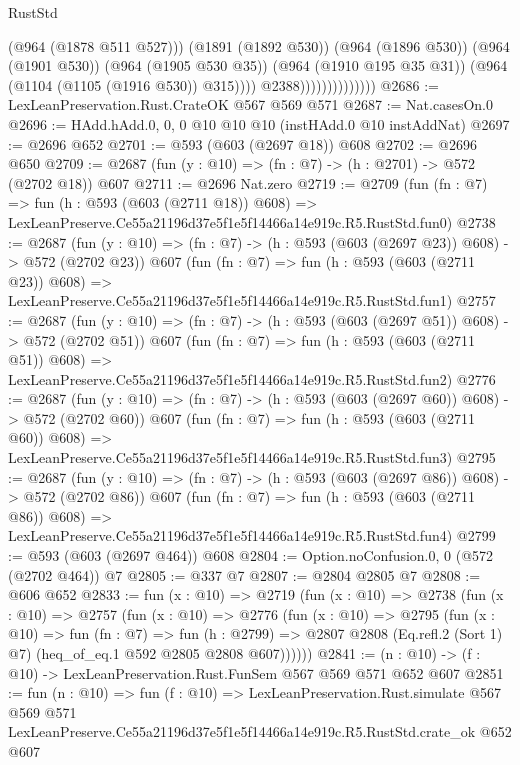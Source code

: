 \begin{lexlean}{RustStd}
\begin{coremodule}
                                      (@964 (@1878 @511 @527)))
                                    (@1891 (@1892 @530))
                                    (@964 (@1896 @530))
                                    (@964 (@1901 @530))
                                    (@964 (@1905 @530 @35))
                                    (@964 (@1910 @195 @35 @31))
                                    (@964 (@1104 (@1105 (@1916 @530)) @315))))
                                @2388))))))))))))))
@2686 := LexLeanPreservation.Rust.CrateOK @567 @569 @571
@2687 := Nat.casesOn.{0}
@2696 := HAdd.hAdd.{0, 0, 0} @10 @10 @10 (instHAdd.{0} @10 instAddNat)
@2697 := @2696 @652
@2701 := @593 (@603 (@2697 @18)) @608
@2702 := @2696 @650
@2709 := @2687 (fun (y : @10) => (fn : @7) -> (h : @2701) -> @572 (@2702 @18)) @607
@2711 := @2696 Nat.zero
@2719 := @2709
    (fun (fn : @7) =>
    fun (h : @593 (@603 (@2711 @18)) @608) =>
    LexLeanPreserve.Ce55a21196d37e5f1e5f14466a14e919c.R5.RustStd.fun0)
@2738 := @2687
    (fun (y : @10) => (fn : @7) -> (h : @593 (@603 (@2697 @23)) @608) -> @572 (@2702 @23))
    @607
    (fun (fn : @7) =>
    fun (h : @593 (@603 (@2711 @23)) @608) =>
    LexLeanPreserve.Ce55a21196d37e5f1e5f14466a14e919c.R5.RustStd.fun1)
@2757 := @2687
    (fun (y : @10) => (fn : @7) -> (h : @593 (@603 (@2697 @51)) @608) -> @572 (@2702 @51))
    @607
    (fun (fn : @7) =>
    fun (h : @593 (@603 (@2711 @51)) @608) =>
    LexLeanPreserve.Ce55a21196d37e5f1e5f14466a14e919c.R5.RustStd.fun2)
@2776 := @2687
    (fun (y : @10) => (fn : @7) -> (h : @593 (@603 (@2697 @60)) @608) -> @572 (@2702 @60))
    @607
    (fun (fn : @7) =>
    fun (h : @593 (@603 (@2711 @60)) @608) =>
    LexLeanPreserve.Ce55a21196d37e5f1e5f14466a14e919c.R5.RustStd.fun3)
@2795 := @2687
    (fun (y : @10) => (fn : @7) -> (h : @593 (@603 (@2697 @86)) @608) -> @572 (@2702 @86))
    @607
    (fun (fn : @7) =>
    fun (h : @593 (@603 (@2711 @86)) @608) =>
    LexLeanPreserve.Ce55a21196d37e5f1e5f14466a14e919c.R5.RustStd.fun4)
@2799 := @593 (@603 (@2697 @464)) @608
@2804 := Option.noConfusion.{0, 0} (@572 (@2702 @464)) @7
@2805 := @337 @7
@2807 := @2804 @2805 @7
@2808 := @606 @652
@2833 := fun (x : @10) =>
  @2719
    (fun (x : @10) =>
    @2738
      (fun (x : @10) =>
      @2757
        (fun (x : @10) =>
        @2776
          (fun (x : @10) =>
          @2795
            (fun (x : @10) =>
            fun (fn : @7) =>
            fun (h : @2799) =>
            @2807 @2808 (Eq.refl.{2} (Sort 1) @7) (heq_of_eq.{1} @592 @2805 @2808 @607))))))
@2841 := (n : @10) -> (f : @10) -> LexLeanPreservation.Rust.FunSem @567 @569 @571 @652 @607
@2851 := fun (n : @10) =>
  fun (f : @10) =>
  LexLeanPreservation.Rust.simulate
    @567
    @569
    @571
    LexLeanPreserve.Ce55a21196d37e5f1e5f14466a14e919c.R5.RustStd.crate_ok
    @652
    @607
\end{coremodule}
\end{lexlean}
